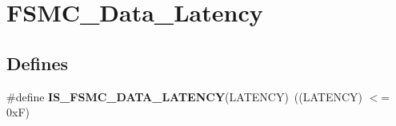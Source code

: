 \hypertarget{group__FSMC__Data__Latency}{
\section{FSMC\_\-Data\_\-Latency}
\label{group__FSMC__Data__Latency}
}
\subsection*{Defines}
\begin{DoxyCompactItemize}
\item 
\hypertarget{group__FSMC__Data__Latency_ga1ab8659a9631d8bb4f57d8be8580155c}{
\#define {\bfseries IS\_\-FSMC\_\-DATA\_\-LATENCY}(LATENCY)~((LATENCY) $<$= 0xF)}
\label{group__FSMC__Data__Latency_ga1ab8659a9631d8bb4f57d8be8580155c}

\end{DoxyCompactItemize}
